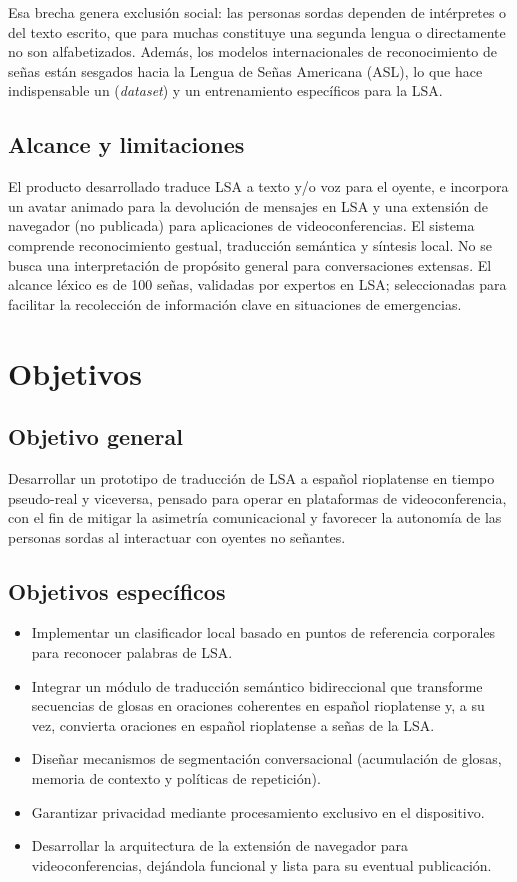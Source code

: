 \documentclass[12pt,a4paper]{report}
\begin{document}
Esa brecha genera exclusión social: las personas sordas dependen de intérpretes o del texto escrito, que para muchas constituye una segunda lengua o directamente no son alfabetizados. Además, los modelos internacionales de reconocimiento de señas están sesgados hacia la Lengua de Señas Americana (ASL), lo que hace indispensable un (\textit{dataset}) y un entrenamiento específicos para la LSA.

\section{Alcance y limitaciones}
El producto desarrollado traduce LSA a texto y/o voz para el oyente, e incorpora un avatar animado para la devolución de mensajes en LSA y una extensión de navegador (no publicada) para aplicaciones de videoconferencias. El sistema comprende reconocimiento gestual, traducción semántica y síntesis local.
No se busca una interpretación de propósito general para conversaciones extensas. El alcance léxico es de 100 señas, validadas por expertos en LSA; seleccionadas para facilitar la recolección de información clave en situaciones de emergencias.

\chapter{Objetivos}
\section{Objetivo general}
Desarrollar un prototipo de traducción de LSA a español rioplatense en tiempo pseudo-real y viceversa, pensado para operar en plataformas de videoconferencia, con el fin de mitigar la asimetría comunicacional y favorecer la autonomía de las personas sordas al interactuar con oyentes no señantes.

\section{Objetivos específicos}
\begin{itemize}
    \item Implementar un clasificador local basado en puntos de referencia corporales para reconocer palabras de LSA.
    \item Integrar un módulo de traducción semántico bidireccional que transforme secuencias de glosas en oraciones coherentes en español rioplatense y, a su vez, convierta oraciones en español rioplatense a señas de la LSA.
    \item Diseñar mecanismos de segmentación conversacional (acumulación de glosas, memoria de contexto y políticas de repetición).
    \item Garantizar privacidad mediante procesamiento exclusivo en el dispositivo.
    \item Desarrollar la arquitectura de la extensión de navegador para videoconferencias, dejándola funcional y lista para su eventual publicación.
\end{itemize}
\end{document}
